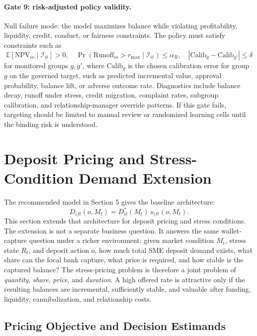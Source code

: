 \documentclass[11pt]{article}
\begin{document}
\paragraph{Gate 9: risk-adjusted policy validity.}
Null failure mode: the model maximizes balance while violating profitability,
liquidity, credit, conduct, or fairness constraints. The policy must satisfy
constraints such as
\[
  \mathbb{E}[\mathrm{NPV}_{io}\mid\mathcal{I}_{it}]>0,\quad
  \Pr(\mathrm{Runoff}_{io}>r_{\max}\mid\mathcal{I}_{it})\le\alpha_R,
  \quad
  |\mathrm{Calib}_g-\mathrm{Calib}_{g'}|\le\delta
\]
for monitored groups $g,g'$, where $\mathrm{Calib}_g$ is the chosen calibration
error for group $g$ on the governed target, such as predicted incremental value,
approval probability, balance lift, or adverse outcome rate. Diagnostics include
balance decay, runoff under stress, credit migration, complaint rates, subgroup
calibration, and relationship-manager override patterns. If this gate fails,
targeting should be limited to manual review or randomized learning cells until
the binding risk is understood.

\section{Deposit Pricing and Stress-Condition Demand Extension}

The recommended model in Section 5 gives the baseline architecture:
\[
  D_{ift}(o,M_t)=D_{it}^{*}(M_t)\,s_{ift}(o,M_t).
\]
This section extends that architecture for deposit pricing and stress
conditions. The extension is not a separate business question. It answers the
same wallet-capture question under a richer environment: given market condition
$M_t$, stress state $R_t$, and deposit action $o$, how much total SME deposit
demand exists, what share can the focal bank capture, what price is required,
and how stable is the captured balance?
The stress-pricing problem is therefore a joint problem of \emph{quantity},
\emph{share}, \emph{price}, and \emph{duration}. A high offered rate is
attractive only if the resulting balances are incremental, sufficiently stable,
and valuable after funding, liquidity, cannibalization, and relationship costs.

\subsection{Pricing Objective and Decision Estimands}
\end{document}

